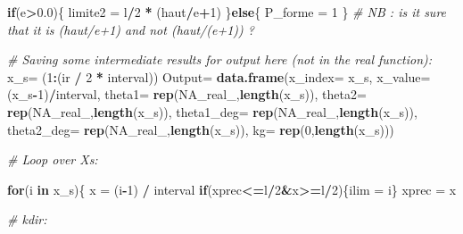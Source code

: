 \documentclass[]{book}
\newenvironment{Shaded}{\begin{snugshade}}{\end{snugshade}}
\newcommand{\KeywordTok}[1]{\textcolor[rgb]{0.13,0.29,0.53}{\textbf{#1}}}
\newcommand{\DataTypeTok}[1]{\textcolor[rgb]{0.13,0.29,0.53}{#1}}
\newcommand{\DecValTok}[1]{\textcolor[rgb]{0.00,0.00,0.81}{#1}}
\newcommand{\FloatTok}[1]{\textcolor[rgb]{0.00,0.00,0.81}{#1}}
\newcommand{\StringTok}[1]{\textcolor[rgb]{0.31,0.60,0.02}{#1}}
\newcommand{\CommentTok}[1]{\textcolor[rgb]{0.56,0.35,0.01}{\textit{#1}}}
\newcommand{\OtherTok}[1]{\textcolor[rgb]{0.56,0.35,0.01}{#1}}
\newcommand{\ControlFlowTok}[1]{\textcolor[rgb]{0.13,0.29,0.53}{\textbf{#1}}}
\newcommand{\OperatorTok}[1]{\textcolor[rgb]{0.81,0.36,0.00}{\textbf{#1}}}
\newcommand{\NormalTok}[1]{#1}
\theoremstyle{definition}
\theoremstyle{definition}
\theoremstyle{definition}
\theoremstyle{remark}
\begin{document}
\begin{Shaded}
\begin{Highlighting}[]
\ControlFlowTok{if}\NormalTok{(e}\OperatorTok{>}\FloatTok{0.0}\NormalTok{)\{}
\NormalTok{  limite2 =}\StringTok{ }\NormalTok{l}\OperatorTok{/}\DecValTok{2} \OperatorTok{*}\StringTok{ }\NormalTok{(haut}\OperatorTok{/}\NormalTok{e}\OperatorTok{+}\DecValTok{1}\NormalTok{)}
\NormalTok{\}}\ControlFlowTok{else}\NormalTok{\{}
\NormalTok{  P_forme =}\StringTok{ }\DecValTok{1}
\NormalTok{\}}
\CommentTok{# NB : is it sure that it is (haut/e+1) and not (haut/(e+1)) ? }

\CommentTok{# Saving some intermediate results for output here (not in the real function):}
\NormalTok{x_s=}\StringTok{ }\NormalTok{(}\DecValTok{1}\OperatorTok{:}\NormalTok{(ir }\OperatorTok{/}\StringTok{ }\DecValTok{2} \OperatorTok{*}\StringTok{ }\NormalTok{interval))}
\NormalTok{Output=}\StringTok{ }\KeywordTok{data.frame}\NormalTok{(}\DataTypeTok{x_index=}\NormalTok{ x_s,}
                   \DataTypeTok{x_value=}\NormalTok{ (x_s}\OperatorTok{-}\DecValTok{1}\NormalTok{)}\OperatorTok{/}\NormalTok{interval,}
                   \DataTypeTok{theta1=} \KeywordTok{rep}\NormalTok{(}\OtherTok{NA_real_}\NormalTok{,}\KeywordTok{length}\NormalTok{(x_s)),}
                   \DataTypeTok{theta2=} \KeywordTok{rep}\NormalTok{(}\OtherTok{NA_real_}\NormalTok{,}\KeywordTok{length}\NormalTok{(x_s)),}
                   \DataTypeTok{theta1_deg=} \KeywordTok{rep}\NormalTok{(}\OtherTok{NA_real_}\NormalTok{,}\KeywordTok{length}\NormalTok{(x_s)),}
                   \DataTypeTok{theta2_deg=} \KeywordTok{rep}\NormalTok{(}\OtherTok{NA_real_}\NormalTok{,}\KeywordTok{length}\NormalTok{(x_s)),}
                   \DataTypeTok{kg=} \KeywordTok{rep}\NormalTok{(}\DecValTok{0}\NormalTok{,}\KeywordTok{length}\NormalTok{(x_s)))}

\CommentTok{# Loop over Xs:}

\ControlFlowTok{for}\NormalTok{(i }\ControlFlowTok{in}\NormalTok{ x_s)\{}
\NormalTok{  x =}\StringTok{ }\NormalTok{(i}\OperatorTok{-}\DecValTok{1}\NormalTok{) }\OperatorTok{/}\StringTok{ }\NormalTok{interval}
  \ControlFlowTok{if}\NormalTok{(xprec}\OperatorTok{<=}\NormalTok{l}\OperatorTok{/}\DecValTok{2}\OperatorTok{&}\NormalTok{x}\OperatorTok{>=}\NormalTok{l}\OperatorTok{/}\DecValTok{2}\NormalTok{)\{ilim =}\StringTok{ }\NormalTok{i\}}
\NormalTok{  xprec =}\StringTok{ }\NormalTok{x}
  
  \CommentTok{# kdir:}
  

\end{Highlighting}
\end{Shaded}
\end{document}
